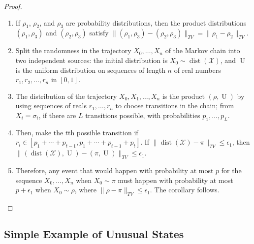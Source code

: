 \documentclass[12pt]{article}
\begin{document}
\begin{proof}
    \begin{enumerate}
        \item
            If \( \rho_1 \), \( \rho_{2} \), and \( \rho_3 \) are
            probability distributions, then the product distributions \(
            (\rho_1 , \rho_3 ) \) and \( (\rho_2 , \rho_3 ) \) satisfy \(
            \| (\rho_1 , \rho_3 )- (\rho_2, \rho_3 )\|_{TV} = \|\rho_1-
            \rho_2 \|_{TV} \).%
        \item
            Split the randomness in the trajectory \( X_0, \dots , X_n \)
            of the Markov chain into two independent sources:  the
            initial distribution is \( X_0 \sim
            \operatorname{dist}
            (\mathcal{X}) \), and \(
            \operatorname{U}
            \) is the uniform distribution on sequences of length \( n \)
            of real numbers \( r_1 , r_2, \dots, r_n \) in \( [0, 1] \).
        \item
            The distribution of the trajectory \( X_0 , X_1,\dots, X_n \)
            is the product \( (\rho,
            \operatorname{U}
            ) \) by using sequences of reals \( r_1, \dots, r_n \) to
            choose transitions in the chain; from \( X_i = \sigma_i \),
            if there are \( L \) transitions possible, with
            probabilities \( p_1, \dots, p_L \).
        \item
            Then, make the \( t \)th possible transition if \( r_i \in [p_1
            + \cdots + p_{t-1}, p_1 + \cdots + p_{t-1 }+ p_t] \).  If \(
            \|
            \operatorname{dist}
            (\mathcal{X})- \pi\|_{TV} \le \epsilon_1 \), then \( \|(
            \operatorname{dist}
            (\mathcal{X}),
            \operatorname{U}
            )- (\pi,
            \operatorname{U}
            )\|_{TV} \le \epsilon_1 \).
        \item
            Therefore, any event that would happen with probability at
            most \( p \) for the sequence \( X_0 ,\dots, X_n \) when \(
            X_0 \sim \pi \) must happen with probability at most \( p +
            \epsilon_1 \) when \( X_0 \sim \rho \), where \( \|\rho- \pi\|_
            {TV} \le \epsilon_1 \).  The corollary follows.
    \end{enumerate}
\end{proof}

\subsection*{Simple Example of Unusual States}
\end{document}

